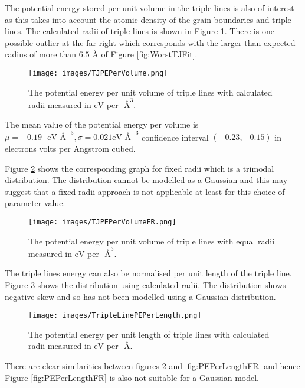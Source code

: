 \documentclass[12pt,a4paper,openany]{report}
\newcommand{\ts}[1]{\textrm{#1}}
\begin{document}
The potential energy stored per unit volume in the triple lines is also of interest as this takes into account the atomic density of the grain boundaries and triple lines. The calculated radii of triple lines is shown in Figure \ref{fig:PEPerVol}. There is one possible outlier at the far right which corresponds with the larger than expected radius of more than $6.5 \textrm{ \AA}$ of Figure \ref{fig:WorstTJFit}. 

\begin{figure}[H]
	\texttt{[image: images/TJPEPerVolume.png]} 
	\caption{The potential energy per unit volume of triple lines with calculated radii measured in $\ts{eV}$ per $\textrm{ \AA}^3$.}	
	\label{fig:PEPerVol}
\end{figure}
The mean value of the potential energy per volume is $\mu = -0.19 \text{ } \ts{eV} \textrm{ \AA}^{-3}, \sigma = 0.021 \ts{eV} \textrm{ \AA}^{-3}$ confidence interval $(-0.23, -0.15)$ in electrons volts per Angstrom cubed.

Figure \ref{fig:PEPerVolFR} shows the corresponding graph for fixed radii which is a trimodal distribution. The distribution cannot be modelled as a Gaussian and this may suggest that a fixed radii approach is not applicable at least for this choice of parameter value.

\begin{figure}
	\texttt{[image: images/TJPEPerVolumeFR.png]} 
		\caption{The potential energy per unit volume of triple lines with equal radii measured in $\ts{eV}$ per $\textrm{ \AA}^3$.}	
	\label{fig:PEPerVolFR}
\end{figure}

\newpage
The triple lines energy can also be normalised per unit length of the triple line. Figure \ref{fig:PEPerLength} shows the distribution using calculated radii. The distribution shows negative skew and so has not been modelled using a Gaussian distribution.   

\begin{figure}[H]
	\texttt{[image: images/TripleLinePEPerLength.png]}
	\caption{The potential energy per unit length of triple lines with calculated radii measured in $\ts{eV}$ per $\textrm{ \AA}$.}	
	\label{fig:PEPerLength} 
\end{figure}

\newpage
There are clear similarities between figures \ref{fig:PEPerVolFR} and \ref{fig:PEPerLengthFR} and hence Figure \ref{fig:PEPerLengthFR} is also not suitable for a Gaussian model.
\end{document}
